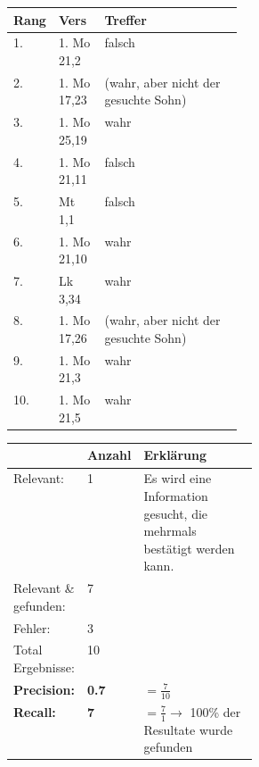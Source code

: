 \begin{table}[H]
	\centering
	\small\renewcommand{\arraystretch}{1.4}
	\begin{tabularx}{0.9\textwidth}{ R{0.1\linewidth} | L{0.2\linewidth} | X }%
		\hline
		Rang & Vers & Treffer \\ \hline {}. & 1. Mo 21,2 & falsch\\
		2. & 1. Mo 17,23 & (wahr, aber nicht der gesuchte Sohn)\\
		3. & 1. Mo 25,19 & wahr\\
		4. & 1. Mo 21,11 & falsch\\
		5. & Mt 1,1 & falsch\\
		6. & 1. Mo 21,10 & wahr\\
		7. & Lk 3,34 & wahr\\
		8. & 1. Mo 17,26 & (wahr, aber nicht der gesuchte Sohn)\\
		9. & 1. Mo 21,3 & wahr\\
		10. & 1. Mo 21,5 & wahr\\
		\hline
	\end{tabularx}
\end{table}


\begin{table}[H]
	\centering
	\small\renewcommand{\arraystretch}{1.4}
	\begin{tabularx}{0.9\textwidth}{ L{0.22\linewidth} | L{0.1\linewidth} | X }%
		\hline
		& Anzahl & Erklärung \\ \hline \hline
		Relevant: & 1 & Es wird eine Information gesucht, die mehrmals bestätigt werden kann.\\
		Relevant \& gefunden: & 7 & \\
		Fehler: & 3 & \\
		Total Ergebnisse: & 10 & \\
		\hline
		\textbf{Precision:} & \textbf{0.7} & $= \frac{7}{10}$ \\
		\textbf{Recall:} & \textbf{7} & $= \frac{7}{1} \rightarrow$ 100\% der Resultate wurde gefunden\\
		\hline\hline
	\end{tabularx}
\end{table}

